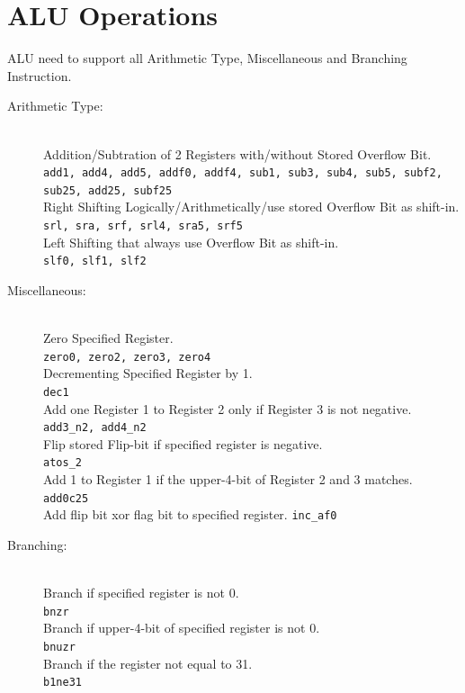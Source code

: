 \documentclass{article}
\begin{document}
  \section{ALU Operations}
    ALU need to support all Arithmetic Type, Miscellaneous and Branching Instruction.
    \begin{description}
      \item[Arithmetic Type:] \quad \\
        Addition/Subtration of 2 Registers with/without Stored Overflow Bit. \\
        \text{\quad -} \texttt{add1, add4, add5, addf0, addf4, sub1, sub3, sub4, sub5, subf2, sub25, add25, subf25} \\
        Right Shifting Logically/Arithmetically/use stored Overflow Bit as shift-in. \\
        \text{\quad -} \texttt{srl, sra, srf, srl4, sra5, srf5} \\
        Left Shifting that always use Overflow Bit as shift-in. \\
        \text{\quad -} \texttt{slf0, slf1, slf2}
      \item[Miscellaneous:] \quad \\
        Zero Specified Register. \\
        \text{\quad -} \texttt{zero0, zero2, zero3, zero4} \\
        Decrementing Specified Register by 1. \\
        \text{\quad -} \texttt{dec1} \\
        Add one Register 1 to Register 2 only if Register 3 is not negative. \\
        \text{\quad -} \texttt{add3\_n2, add4\_n2} \\
        Flip stored Flip-bit if specified register is negative. \\
        \text{\quad -} \texttt{atos\_2} \\
        Add 1 to Register 1 if the upper-4-bit of Register 2 and 3 matches. \\
        \text{\quad -} \texttt{add0c25} \\
        Add flip bit xor flag bit to specified register.
        \text{\quad -} \texttt{inc\_af0}
      \item[Branching:] \quad \\
        Branch if specified register is not 0. \\
        \text{\quad -} \texttt{bnzr} \\
        Branch if upper-4-bit of specified register is not 0. \\
        \text{\quad -} \texttt{bnuzr} \\
        Branch if the register not equal to 31. \\
        \text{\quad -} \texttt{b1ne31}
    \end{description}
\end{document}
